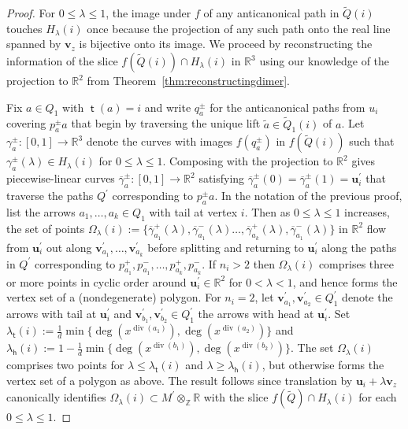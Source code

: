 \documentclass[11pt,a4paper]{amsart}
\numberwithin{equation}{section}
\theoremstyle{definition}
\theoremstyle{remark}
\newcommand{\RR}{\ensuremath{\mathbb{R}}}
\newcommand{\ZZ}{\ensuremath{\mathbb{Z}}}
\renewcommand{\div}{\operatorname{div}}
\newcommand{\head}{\operatorname{\mathsf{h}}}
\newcommand{\tail}{\operatorname{\mathsf{t}}}
\begin{document}
\begin{proof}
For $0\leq \lambda\leq 1$, the image under $f$ of any anticanonical path in $\widetilde{Q}(i)$ touches $H_\lambda(i)$ once because the projection of any such path onto the real line spanned by $\mathbf{v}_z$ is bijective onto its image. We proceed by reconstructing the information of the slice $f(\widetilde{Q}(i))\cap H_\lambda(i)$ in $\RR^3$ using our knowledge of the projection to $\RR^2$ from Theorem~\ref{thm:reconstructingdimer}.

Fix $a\in Q_1$ with $\tail(a)=i$ and write $q_a^\pm$ for the anticanonical paths from $u_i$ covering $p_a^\pm a$ that begin by traversing the unique lift $\widetilde{a}\in \widetilde{Q}_1(i)$ of $a$. Let $\gamma_a^\pm\colon [0,1]\to \RR^3$ denote the curves with images $f(q_a^\pm)$ in $f(\widetilde{Q}(i))$ such that $\gamma_a^\pm(\lambda)\in H_\lambda(i)$ for $0\leq \lambda \leq 1$. Composing with the projection to $\RR^2$ gives piecewise-linear curves $\overline{\gamma}_a^\pm\colon [0,1]\to \RR^2$ satisfying $\overline{\gamma}_a^\pm(0) = \overline{\gamma}_a^\pm(1) = \mathbf{u}^\prime_i$ that traverse the paths $Q^\prime$ corresponding to $p_a^\pm a$. In the notation of the previous proof, list the arrows $a_1,\dots, a_k\in Q_1$ with tail at vertex $i$. Then as $0\leq \lambda \leq 1$ increases, the set of points $\Omega_\lambda(i):=\{\overline{\gamma}_{a_1}^+(\lambda),\overline{\gamma}_{a_1}^-(\lambda) \dots, \overline{\gamma}_{a_k}^+(\lambda), \overline{\gamma}_{a_1}^-(\lambda)\}$ in $\RR^2$ flow from $\mathbf{u}^\prime_i$ out along $\mathbf{v}^\prime_{a_1}, \dots, \mathbf{v}^\prime_{a_k}$ before splitting and returning to $\mathbf{u}_i^\prime$ along the paths in $Q^\prime$ corresponding to $p_{a_1}^+, p_{a_1}^-, \dots, p_{a_k}^+, p_{a_k}^-$.  If $n_i>2$ then $\Omega_\lambda(i)$ comprises three or more points in cyclic order around $\mathbf{u}_i^\prime\in \RR^2$  for $0<\lambda<1$, and hence forms the vertex set of a (nondegenerate) polygon.  For $n_i=2$, let $\mathbf{v}^\prime_{a_1}, \mathbf{v}^\prime_{a_2}\in Q^\prime_1$ denote the arrows with tail at $\mathbf{u}_i^\prime$ and $\mathbf{v}^\prime_{b_1}, \mathbf{v}^\prime_{b_2}\in Q^\prime_1$ the arrows with head at $\mathbf{u}_i^\prime$. Set $\lambda_{\tail}(i):=\frac{1}{d} \min\{\deg(x^{\div(a_1)}),\deg(x^{\div(a_2)})\}$ and $\lambda_{\head}(i):=1-\frac{1}{d} \min\{\deg(x^{\div(b_1)}),\deg(x^{\div(b_2)})\}$. The set $\Omega_\lambda(i)$ comprises two points for $\lambda\leq \lambda_{\tail}(i)$ and $\lambda\geq \lambda_{\head}(i)$,  but otherwise forms the vertex set of a polygon as above. The result follows since translation by $\mathbf{u}_i+ \lambda\mathbf{v}_z$ canonically identifies  $\Omega_\lambda(i)\subset M^\prime \otimes_\ZZ \RR$ with the slice $f(\widetilde{Q})\cap H_\lambda(i)$ for each $0\leq \lambda\leq 1$.
 \end{proof}
   
\end{document}

